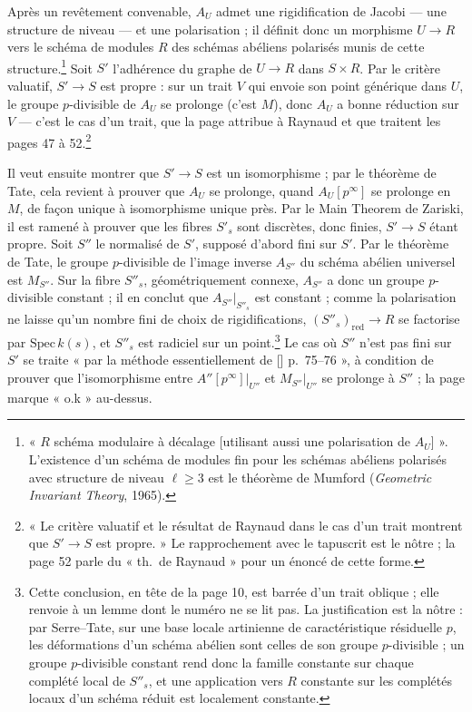 \documentclass[11pt,a4paper]{article}
\begin{document}
Après un revêtement convenable, $A_U$ admet une rigidification de Jacobi
--- une structure de niveau --- et une polarisation ; il définit donc un
morphisme $U \to R$ vers le schéma de modules $R$ des schémas abéliens
polarisés munis de cette structure.\footnote{« $R$ schéma modulaire à
décalage [utilisant aussi une polarisation de $A_U$] ». L'existence d'un schéma de modules fin pour
les schémas abéliens polarisés avec structure de niveau $\ell \geq 3$ est le
théorème de Mumford (\emph{Geometric Invariant Theory}, 1965).} Soit $S'$
l'adhérence du graphe de $U \to R$ dans $S \times R$. Par le critère valuatif,
$S' \to S$ est propre : sur un trait $V$ qui envoie son point générique dans
$U$, le groupe $p$-divisible de $A_U$ se prolonge (c'est $M$), donc $A_U$ a
bonne réduction sur $V$ --- c'est le cas d'un trait, que la page attribue à
Raynaud et que traitent les pages 47 à 52.\footnote{« Le critère valuatif et
le résultat de Raynaud dans le cas d'un trait montrent que $S' \to S$ est
propre. » Le rapprochement avec le
tapuscrit est le nôtre ; la page 52 parle du « th.\ de Raynaud » pour un
énoncé de cette forme.}

Il veut ensuite montrer que $S' \to S$ est un isomorphisme ; par le
théorème de Tate, cela revient à prouver que $A_U$ se prolonge, quand
$A_U[p^\infty]$ se prolonge en $M$, de façon unique à isomorphisme unique
près. Par le Main Theorem de Zariski, il est ramené à prouver que les fibres
$S'_s$ sont discrètes, donc finies, $S' \to S$ étant propre. Soit $S''$ le
normalisé de $S'$, supposé d'abord fini sur $S'$. Par le théorème de Tate, le
groupe $p$-divisible de l'image inverse $A_{S''}$ du schéma abélien universel
est $M_{S''}$. Sur la fibre $S''_s$, géométriquement connexe, $A_{S''}$ a donc
un groupe $p$-divisible constant ; il en conclut que $A_{S''}|_{S''_s}$ est
constant ; comme la polarisation ne laisse qu'un nombre fini de choix de
rigidifications, $(S''_s)_{\mathrm{red}} \to R$ se factorise par
$\mathrm{Spec}\,k(s)$, et $S''_s$ est radiciel sur un point.\footnote{Cette
conclusion, en tête de la page 10, est barrée d'un trait oblique ; elle
renvoie à un lemme dont le numéro ne se lit pas. La justification est la
nôtre : par Serre--Tate, sur une base locale artinienne de caractéristique
résiduelle $p$, les déformations d'un schéma abélien sont celles de son
groupe $p$-divisible ; un groupe $p$-divisible constant rend donc la famille
constante sur chaque complété local de $S''_s$, et une application vers $R$
constante sur les complétés locaux d'un schéma réduit est localement
constante.} Le cas où $S''$ n'est pas fini sur $S'$ se traite « par la
méthode essentiellement de [\;] p.\ 75--76 », à condition de prouver que
l'isomorphisme entre $A''[p^\infty]|_{U''}$ et $M_{S''}|_{U''}$ se prolonge
à $S''$ ; la page marque « o.k » au-dessus.
\end{document}
